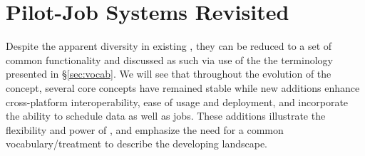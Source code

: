 \documentclass{sig-alternate}
\begin{document}





\section{Pilot-Job Systems Revisited}
Despite the apparent diversity in existing \pilotjobs,
they can be reduced to a set of common functionality and
discussed as such via use of the the terminology presented
in \S\ref{sec:vocab}.
We will see that throughout the evolution
of the \pilotjob concept, several core concepts have remained stable
while new additions enhance cross-platform interoperability,
ease of usage and deployment, and incorporate the ability to
schedule data as well as jobs.   These additions illustrate
the flexibility and power of \pilotjobs, and emphasize the
need for a common vocabulary/treatment to describe the
developing landscape.
\end{document}
